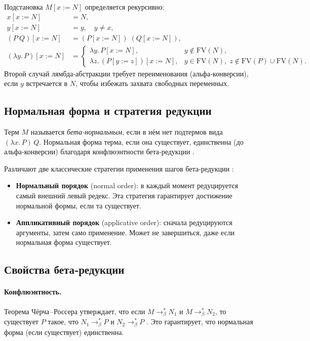 Подстановка \(M[x:=N]\) определяется рекурсивно:
\[
  \begin{aligned}
    x[x:=N] &= N,\\
    y[x:=N] &= y,\quad y\neq x,\\
    (P\ Q)[x:=N] &= (P[x:=N])\;(Q[x:=N]),\\
    (\lambda y.\,P)[x:=N] &=
      \begin{cases}
        \lambda y.\,P[x:=N], & y\notin\mathrm{FV}(N),\\
        \lambda z.\,(P[y:=z])[x:=N], & y\in\mathrm{FV}(N),\; z\notin\mathrm{FV}(P)\cup\mathrm{FV}(N).
      \end{cases}
  \end{aligned}
\]
Второй случай лямбда‑абстракции требует переименования (альфа‑конверсии), если \(y\) встречается в \(N\), чтобы избежать захвата свободных переменных.

\subsection{Нормальная форма и стратегия редукции}
Терм \(M\) называется \emph{бета‑нормальным}, если в нём нет подтермов вида \((\lambda x.\,P)\,Q\). Нормальная форма терма, если она существует, единственна (до альфа‑конверсии) благодаря конфлюэнтности бета‑редукции \cite{ChurchRosser}.  

Различают две классические стратегии применения шагов бета‑редукции \cite{Plotkin1975}:
\begin{itemize}
  \item \textbf{Нормальный порядок} (normal order): в каждый момент редуцируется самый внешний левый редекс. Эта стратегия гарантирует достижение нормальной формы, если та существует.
  \item \textbf{Аппликативный порядок} (applicative order): сначала редуцируются аргументы, затем само применение. Может не завершиться, даже если нормальная форма существует.
\end{itemize}


\subsection{Свойства бета‑редукции}
\paragraph{Конфлюэнтность.} Теорема Чёрча – Россера утверждает, что если \(M \to_\beta^* N_1\) и \(M \to_\beta^* N_2\), то существует \(P\) такое, что \(N_1 \to_\beta^* P\) и \(N_2 \to_\beta^* P\) \cite{ChurchRosser}. Это гарантирует, что нормальная форма (если существует) единственна.  


